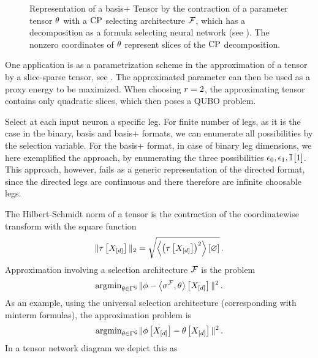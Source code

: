 \begin{figure}[t]
    \begin{center}
        
    \end{center}
    \caption{Representation of a basis+ Tensor by the contraction of a parameter tensor $\theta$ with a $\mathrm{CP}$ selecting architecture $\mathcal{F}$, which has a decomposition as a formula selecting neural network (see ).
    The nonzero coordinates of $\theta$ represent slices of the $\mathrm{CP}$ decomposition.
    }
\end{figure}\label{fig:sliceSelectingNN}



One application is as a parametrization scheme in the approximation of a tensor by a slice-sparse tensor, see .
The approximated parameter can then be used as a proxy energy to be maximized.
When choosing $r=2$, the approximating tensor contains only quadratic slices, which then poses a QUBO problem.

\begin{remark}
    Select at each input neuron a specific leg.
    For finite number of legs, as it is the case in the binary, basis and basis+ formats, we can enumerate all possibilities by the selection variable.
    For the basis+ format, in case of binary leg dimensions, we here exemplified the approach, by enumerating the three possibilities $\epsilon_{0},\epsilon_{1},\mathbb{I}\left[1\right]$.
    This approach, however, fails as a generic representation of the directed format, since the directed legs are continuous and there therefore are infinite choosable legs.
\end{remark}






The Hilbert-Schmidt norm of a tensor is the contraction of the coordinatewise transform with the square function
\begin{align*}
	\|\tau\left[X_{[d]}\right]\|_2= \sqrt{\left\langle \left(\tau\left[X_{[d]}\right]\right)^2\right\rangle \left[ \varnothing \right]} \, .
\end{align*}
Approximation involving a selection architecture $\mathcal{F}$ is the problem
	\[ \mathrm{argmin}_{\theta\in\Gamma^{\mathcal{G}}} \|\phi - \left\langle \sigma^{\mathcal{F}},\theta\right\rangle \left[ X_{[d]} \right]\|^2 \, . \]
As an example, using the universal selection architecture (corresponding with minterm formulas), the approximation problem is
	\[ \mathrm{argmin}_{\theta\in\Gamma^{\mathcal{G}}} \|\phi\left[X_{[d]}\right] - \theta\left[X_{[d]}\right]\|^2 \, . \]
In a tensor network diagram we depict this as
\begin{center}
    
\end{center}


